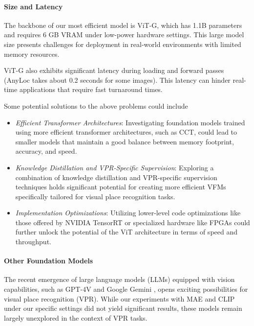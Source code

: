\paragraph{Size and Latency}

The backbone of our most efficient model is ViT-G, which has 1.1B
parameters and requires 6 GB VRAM under low-power hardware settings.
This large model size presents challenges for deployment in real-world
environments with limited memory resources.

ViT-G also exhibits significant latency during loading and forward
passes (AnyLoc takes about 0.2 seconds for some images). This latency
can hinder real-time applications that require fast turnaround times.

Some potential solutions to the above problems could include

\begin{itemize}
    \item \emph{Efficient Transformer Architectures}:  Investigating
        foundation models trained using more efficient transformer
        architectures, such as CCT, could lead to smaller models that
        maintain a good balance between memory footprint, accuracy,
        and speed.
    \item \emph{Knowledge Distillation and VPR-Specific Supervision}:
        Exploring a combination of knowledge distillation and
        VPR-specific supervision techniques holds significant
        potential for creating more efficient VFMs specifically
        tailored for visual place recognition tasks.
    \item \emph{Implementation Optimizations}: Utilizing lower-level 
        code optimizations like those offered by NVIDIA TensorRT
        \cite{Zhou2022ExploringTT} or specialized hardware like FPGAs
        \cite{Wang2022ViAAN} could further unlock the potential of the
        ViT architecture in terms of speed and throughput.
\end{itemize}

\paragraph{Other Foundation Models}

The recent emergence of large language models (LLMs) equipped with
vision capabilities, such as GPT-4V \cite{Yang2023TheDO} and Google
Gemini \cite{Anil2023GeminiAF}, opens exciting possibilities for
visual place recognition (VPR). While our experiments with MAE
\cite{He2021MaskedAA} and CLIP \cite{Ilharco2021OpenCLIP} under our
specific settings did not yield significant results, these models
remain largely unexplored in the context of VPR tasks.

